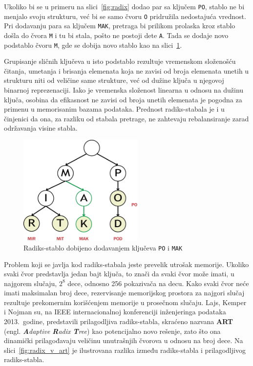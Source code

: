 \documentclass[12pt,oneside]{memoir}
\begin{document}
Ukoliko bi se u primeru na
slici~\ref{fig:radix} dodao par sa ključem \texttt{PO},
stablo ne bi menjalo svoju strukturu, već
bi se samo čvoru \texttt{O} pridružila nedostajuća vrednost.
Pri dodavanju para sa ključem \texttt{MAK}, pretraga bi prilikom prolaska
kroz stablo došla do čvora \texttt{M} i tu bi stala,
pošto ne postoji dete \texttt{A}. Tada se dodaje novo podstablo
čvoru \texttt{M}, gde se dobija novo stablo kao na slici~\ref{fig:radix2}.


Grupisanje sličnih ključeva u
isto podstablo rezultuje vremenskom složenošću čitanja, umetanja i brisanja
elemenata koja ne zavisi od broja elemenata
unetih u strukturu niti od veličine same strukture, već od
dužine ključa u njegovoj binarnoj reprezenaciji. Iako je vremenska složenost linearna
u odnosu na dužinu ključa,
osobina da efikasnost ne zavisi od broja unetih elemenata je pogodna za primenu
u memorisanim bazama podataka. Prednost radiks-stabala je i u činjenici da ona,
za razliku od stabala pretrage, ne zahtevaju rebalansiranje zarad
održavanja visine stabla.

\begin{figure}[!h]
  \centering
  \includegraphics[width=0.55\textwidth]{radix_tree_2.eps}
  \caption{Radiks-stablo dobijeno dodavanjem ključeva \texttt{PO} i \texttt{MAK}}
  \label{fig:radix2}
\end{figure}

Problem koji se javlja kod radiks-stabala jeste prevelik utrošak memorije.
Ukoliko svaki čvor predstavlja jedan bajt ključa, to znači da
svaki čvor može imati, u najgorem slučaju, $ 2^{8} $ dece,
odnosno 256 pokazivača na decu.
Kako svaki čvor neće imati maksimalan broj dece, rezervisanje memorijskog prostora
za najgori slučaj rezultuje prekomernim korišćenjem memorije u prosečnom slučaju.
Lajs, Kemper i Nojman su, na IEEE internacionalnoj konferenciji inženjeringa
podataka 2013.\ godine, predstavili prilagodljiva radiks-stabla,
skraćeno nazvana \textbf{ART}~\cite{artful}
(engl. \emph{\textbf{A}daptive \textbf{R}adix \textbf{T}ree})
kao potencijalno novo rešenje, zato što ona dinamički
prilagođavaju veličinu unutrašnjih čvorova u odnosu na broj dece.
Na slici~\ref{fig:radix_v_art} je ilustrovana razlika između radiks-stabla i
prilagodljivog radiks-stabla.
\end{document}
